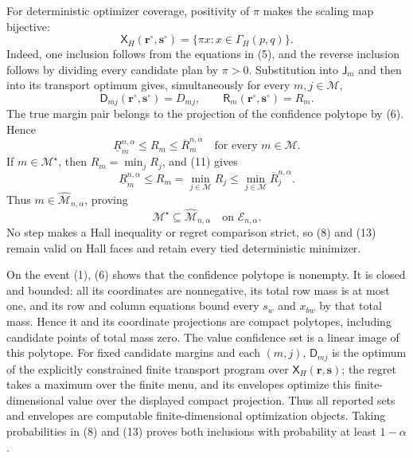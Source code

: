 For deterministic optimizer coverage, positivity of \(\pi\) makes the scaling map bijective:
\[
 \mathsf X_H(\mathbf r^\circ,\mathbf s^\circ)
 =\{\pi x:x\in\Gamma_H(p,q)\}.                          \tag{9}
\]
Indeed, one inclusion follows from the equations in (5), and the reverse inclusion follows by dividing every candidate plan by \(\pi>0\).  Substitution into \(\mathsf J_m\) and then into its transport optimum gives, simultaneously for every \(m,j\in\mathcal M\),
\[
 \mathsf D_{mj}(\mathbf r^\circ,\mathbf s^\circ)=D_{mj},
 \qquad
 \mathsf R_m(\mathbf r^\circ,\mathbf s^\circ)=R_m.       \tag{10}
\]
The true margin pair belongs to the projection of the confidence polytope by (6).  Hence
\[
 \underline R_m^{n,\alpha}\le R_m\le\overline R_m^{n,\alpha}
 \quad\text{for every }m\in\mathcal M.                  \tag{11}
\]
If \(m\in\mathcal M^\star\), then \(R_m=\min_jR_j\), and (11) gives
\[
 \underline R_m^{n,\alpha}
 \le R_m
 =\min_{j\in\mathcal M}R_j
 \le\min_{j\in\mathcal M}\overline R_j^{n,\alpha}.     \tag{12}
\]
Thus \(m\in\widehat{\mathcal M}_{n,\alpha}\), proving
\[
 \mathcal M^\star\subseteq\widehat{\mathcal M}_{n,\alpha}
 \quad\text{on }\mathcal E_{n,\alpha}.                  \tag{13}
\]
No step makes a Hall inequality or regret comparison strict, so (8) and (13) remain valid on Hall faces and retain every tied deterministic minimizer.

On the event (1), (6) shows that the confidence polytope is nonempty.  It is closed and bounded: all its coordinates are nonnegative, its total row mass is at most one, and its row and column equations bound every \(s_w\) and \(x_{bw}\) by that total mass.  Hence it and its coordinate projections are compact polytopes, including candidate points of total mass zero.  The value confidence set is a linear image of this polytope.  For fixed candidate margins and each \((m,j)\), \(\mathsf D_{mj}\) is the optimum of the explicitly constrained finite transport program over \(\mathsf X_H(\mathbf r,\mathbf s)\); the regret takes a maximum over the finite menu, and its envelopes optimize this finite-dimensional value over the displayed compact projection.  Thus all reported sets and envelopes are computable finite-dimensional optimization objects.  Taking probabilities in (8) and (13) proves both inclusions with probability at least \(1-\alpha\).

